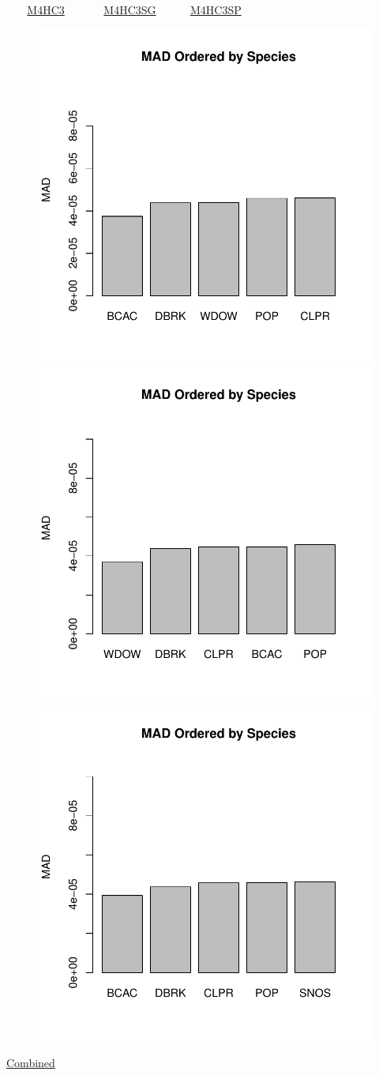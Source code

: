 \documentclass[ xcolor = pdftex, dvipsnames, table ]{beamer}
\begin{document}
%
%

\begin{frame}{$~~~~~~~$ \href{https://github.com/gasduster99/sppComp/tree/master/sscRuns/25019781982M4HC3}{M4HC3} $~~~~~~~~~~~~~$ \href{https://github.com/gasduster99/sppComp/tree/master/sscRuns/25019781982M4HC3SG}{M4HC3SG} $~~~~~~~~~~~$ \href{https://github.com/gasduster99/sppComp/tree/master/sscRuns/25019781982M4HC3SP}{M4HC3SP} }
        \begin{figure}[ht!]
        \centering
        \hspace*{-1cm}
        \includegraphics[width=.4\textwidth]{../sscRuns/25019781982M4HC3/sppHeadMad68.pdf}
        \includegraphics[width=.4\textwidth]{../sscRuns/25019781982M4HC3SG/sppHeadMad68.pdf}
        \includegraphics[width=.4\textwidth]{../sscRuns/25019781982M4HC3SP/sppHeadMad68.pdf}
        \end{figure}
	\vspace{-1cm}
	\begin{center}
	\Large
	\href{https://github.com/gasduster99/sppComp/tree/master/try1/postSSC/25019781982M4HC3SPSG}{Combined}
	\end{center}
\end{frame}
\end{document}
